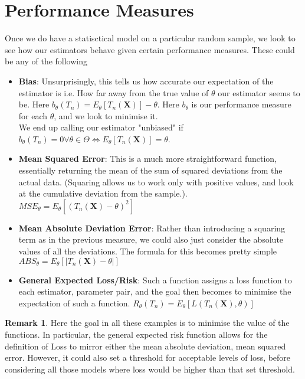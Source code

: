 \documentclass[12pt]{book}
\theoremstyle{definition}
\newtheorem*{remark}{Remark}
\begin{document}
\section{Performance Measures}
Once we do have a statisctical model on a particular random sample, we look to see how our estimators behave given certain performance measures. These could be any of the following \begin{itemize}
    \item \textbf{Bias}: Unsurprisingly, this tells us how accurate our expectation of the estimator is i.e. How far away from the true value of $\theta$ our estimator seems to be. Here $b_{\theta}(T_n) = E_{\theta}[T_n(\mathbf{X})] - \theta$. Here $b_{\theta}$ is our performance measure for each $\theta$, and we look to minimise it. \\ We end up calling our estimator "unbiased" if $b_{\theta}(T_n) = 0 \forall \theta \in \Theta \iff E_{\theta}[T_n(\mathbf{X})] = \theta$.
    \item \textbf{Mean Squared Error}: This is a much more straightforward function, essentially returning the mean of the sum of squared deviations from the actual data. (Squaring allows us to work only with positive values, and look at the cumulative deviation from the sample.). $MSE_{\theta} = E_{\theta}[(T_n(\mathbf{X}) - \theta)^2]$
    \item \textbf{Mean Absolute Deviation Error}: Rather than introducing a squaring term as in the previous measure, we could also just consider the absolute values of all the deviations. The formula for this becomes pretty simple $ABS_{\theta} = E_{\theta}[|T_n(\mathbf{X}) - \theta|]$
    \item \textbf{General Expected Loss/Risk}: Such a function assigns a loss function to each estimator, parameter pair, and the goal then becomes to minimise the expectation of such a function. $R_{\theta}(T_n) = E_{\theta}[L(T_n(\mathbf{X}), \theta)]$
\end{itemize}
\begin{remark}
    Here the goal in all these examples is to minimise the value of the functions. In particular, the general expected risk function allows for the definition of Loss to mirror either the mean absolute deviation, mean squared error. However, it could also set a threshold for acceptable levels of loss, before considering all those models where loss would be higher than that set threshold.
\end{remark}
\end{document}

